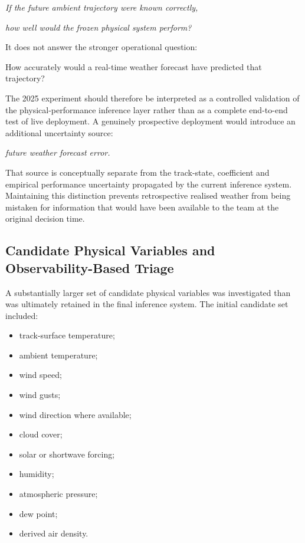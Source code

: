 \begin{center}\textit{If the future ambient trajectory were known correctly,}\end{center}

\begin{center}\textit{how well would the frozen physical system perform?}\end{center}

It does not answer the stronger operational question:

How accurately would a real-time weather forecast have predicted that trajectory?

The 2025 experiment should therefore be interpreted as a controlled validation of the physical-performance inference layer rather than as a complete end-to-end test of live deployment. A genuinely prospective deployment would introduce an additional uncertainty source:

\begin{center}\textit{future weather forecast error.}\end{center}

That source is conceptually separate from the track-state, coefficient and empirical performance uncertainty propagated by the current inference system. Maintaining this distinction prevents retrospective realised weather from being mistaken for information that would have been available to the team at the original decision time.

\subsection{Candidate Physical Variables and Observability-Based Triage}
A substantially larger set of candidate physical variables was investigated than was ultimately retained in the final inference system. The initial candidate set included:

\begin{itemize}
\item track-surface temperature;
\item ambient temperature;
\item wind speed;
\item wind gusts;
\item wind direction where available;
\item cloud cover;
\item solar or shortwave forcing;
\item humidity;
\item atmospheric pressure;
\item dew point;
\item derived air density.
\end{itemize}

